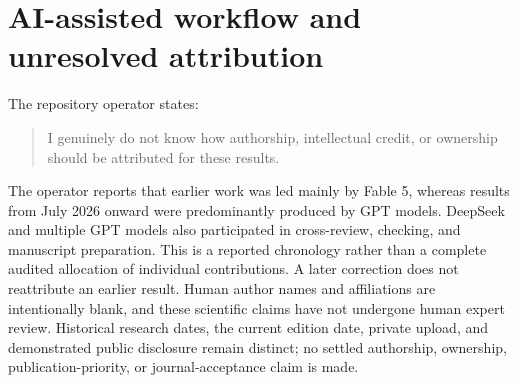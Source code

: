 \documentclass[11pt,a4paper]{article}
\theoremstyle{remark}\newtheorem{remark}[theorem]{Remark}
\begin{document}
\section*{AI-assisted workflow and unresolved attribution}
The repository operator states:
\begin{quote}
I genuinely do not know how authorship, intellectual credit, or ownership should be attributed for these results.
\end{quote}
The operator reports that earlier work was led mainly by Fable 5, whereas results from July 2026 onward were predominantly produced by GPT models.
DeepSeek and multiple GPT models also participated in cross-review, checking, and manuscript preparation.
This is a reported chronology rather than a complete audited allocation of individual contributions.
A later correction does not reattribute an earlier result.
Human author names and affiliations are intentionally blank, and these scientific claims have not undergone human expert review.
Historical research dates, the current edition date, private upload, and demonstrated public disclosure remain distinct; no settled authorship, ownership, publication-priority, or journal-acceptance claim is made.


\end{document}
